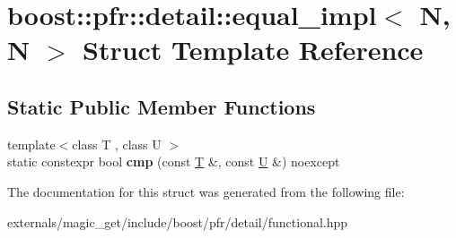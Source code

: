 \hypertarget{structboost_1_1pfr_1_1detail_1_1equal__impl_3_01_n_00_01_n_01_4}{}\section{boost\+:\+:pfr\+:\+:detail\+:\+:equal\+\_\+impl$<$ N, N $>$ Struct Template Reference}
\label{structboost_1_1pfr_1_1detail_1_1equal__impl_3_01_n_00_01_n_01_4}
\subsection*{Static Public Member Functions}
\begin{DoxyCompactItemize}
\item 
\mbox{\label{structboost_1_1pfr_1_1detail_1_1equal__impl_3_01_n_00_01_n_01_4_a36ef75733e0aa5fece45d7be650797df}} 
{\footnotesize template$<$class T , class U $>$ }\\static constexpr bool {\bfseries cmp} (const \mbox{\hyperlink{struct_t}{T}} \&, const \mbox{\hyperlink{union_u}{U}} \&) noexcept
\end{DoxyCompactItemize}


The documentation for this struct was generated from the following file\+:\begin{DoxyCompactItemize}
\item 
externals/magic\+\_\+get/include/boost/pfr/detail/functional.\+hpp\end{DoxyCompactItemize}
